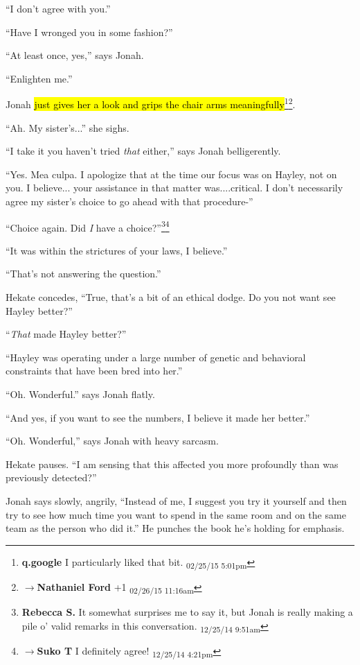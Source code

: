 ``I don't agree with you.''

``Have I wronged you in some fashion?''

``At least once, yes,'' says Jonah.

``Enlighten me.''

Jonah \hl{just gives her a look and grips the chair arms meaningfully}\footnote{\textbf{q.google }I particularly liked that bit. \textsubscript{02/25/15 5:01pm}}\footnote{$\rightarrow$\textbf{Nathaniel Ford }+1 \textsubscript{02/26/15 11:16am}}.

``Ah.  My sister's...'' she sighs.

``I take it you haven't tried \textit{that} either,'' says Jonah belligerently.

``Yes.  Mea culpa.  I apologize that at the time our focus was on Hayley, not on you.  I believe... your assistance in that matter was....critical.  I don't necessarily agree my sister's choice to go ahead with that procedure-''

``Choice again.  Did \textit{I} have a choice?''\footnote{\textbf{Rebecca S. }It somewhat surprises me to say it, but Jonah is really making a pile o' valid remarks in this conversation. \textsubscript{12/25/14 9:51am}}\footnote{$\rightarrow$\textbf{Suko T }I definitely agree! \textsubscript{12/25/14 4:21pm}}

``It was within the strictures of your laws, I believe.''

``That's not answering the question.''

Hekate concedes, ``True, that's a bit of an ethical dodge.  Do you not want see Hayley better?''

``\textit{That} made Hayley better?''

``Hayley was operating under a large number of genetic and behavioral constraints that have been bred into her.''

``Oh.  Wonderful.'' says Jonah flatly.

``And yes, if you want to see the numbers, I believe it made her better.''

``Oh.  Wonderful,'' says Jonah with heavy sarcasm.

Hekate pauses.  ``I am sensing that this affected you more profoundly than was previously detected?''

Jonah says slowly, angrily,  ``Instead of me, I suggest you try it yourself and then try to see how much time you want to spend in the same room and on the same team as the person who did it.'' He punches the book he's holding for emphasis.

